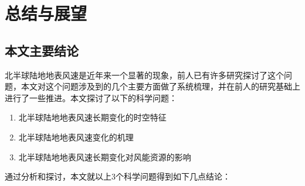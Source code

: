 \chapter{总结与展望}\label{chap:conclusion}

\section{本文主要结论}

北半球陆地地表风速是近年来一个显著的现象，前人已有许多研究探讨了这个问题，本文对这个问题涉及到的几个主要方面做了系统梳理，并在前人的研究基础上进行了一些推进。本文探讨了以下的科学问题：

\begin{enumerate}

\item 北半球陆地地表风速长期变化的时空特征

\item 北半球陆地地表风速变化的机理

\item 北半球陆地地表风速长期变化对风能资源的影响

\end{enumerate}

通过分析和探讨，本文就以上3个科学问题得到如下几点结论：

